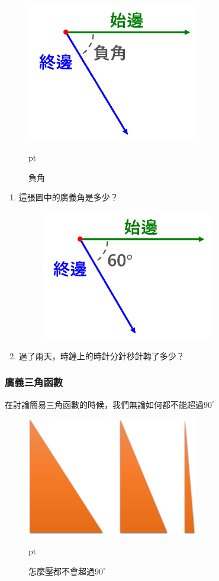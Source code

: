 \begin{figure}[H]
\centering
\graphicspath{{physics/}}
\includegraphics[width=7.5cm, center]{neg-angle.png}
\caption{負角}  pt
\label{fig:neg-angle}
\end{figure}

\noindent
{}
\begin{enumerate}
\item 這張圖中的廣義角是多少？
\begin{figure}[H]
\centering
\graphicspath{{physics/}}
\includegraphics[width=7.5cm, center]{angle-test.png}
\label{fig:angle-test}
\end{figure}
\item 過了兩天，時鐘上的時針分針秒針轉了多少？
\end{enumerate}

\subsubsection{廣義三角函數}
在討論簡易三角函數的時候，我們無論如何都不能超過$90^\circ$
\begin{figure}[H]
\centering
\graphicspath{{physics/}}
\includegraphics[width=7.5cm, center]{over-90-tri.png}
\caption{怎麼壓都不會超過$90^\circ$}  pt
\label{fig:neg-angle}
\end{figure}

